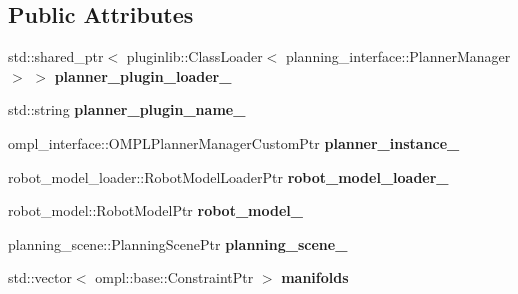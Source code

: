 \subsection*{Public Attributes}
\begin{DoxyCompactItemize}
\item 
\mbox{\label{class_r_n_b_1_1_moveit_compact_1_1_planner_a699273092d7acf03820904b416011a55}} 
std\+::shared\+\_\+ptr$<$ pluginlib\+::\+Class\+Loader$<$ planning\+\_\+interface\+::\+Planner\+Manager $>$ $>$ {\bfseries planner\+\_\+plugin\+\_\+loader\+\_\+}
\item 
\mbox{\label{class_r_n_b_1_1_moveit_compact_1_1_planner_acb371b25a0313b228f51af6cffe53ea5}} 
std\+::string {\bfseries planner\+\_\+plugin\+\_\+name\+\_\+}
\item 
\mbox{\label{class_r_n_b_1_1_moveit_compact_1_1_planner_ace4a50ccd6df165981411e7d7177f477}} 
ompl\+\_\+interface\+::\+O\+M\+P\+L\+Planner\+Manager\+Custom\+Ptr {\bfseries planner\+\_\+instance\+\_\+}
\item 
\mbox{\label{class_r_n_b_1_1_moveit_compact_1_1_planner_a2cd6db06c9c271f5c00d1bfb4768743d}} 
robot\+\_\+model\+\_\+loader\+::\+Robot\+Model\+Loader\+Ptr {\bfseries robot\+\_\+model\+\_\+loader\+\_\+}
\item 
\mbox{\label{class_r_n_b_1_1_moveit_compact_1_1_planner_a4cb1bfd8389d3697aef6371cd5a16028}} 
robot\+\_\+model\+::\+Robot\+Model\+Ptr {\bfseries robot\+\_\+model\+\_\+}
\item 
\mbox{\label{class_r_n_b_1_1_moveit_compact_1_1_planner_aa4eafd49a28d153cafcf17d248016c92}} 
planning\+\_\+scene\+::\+Planning\+Scene\+Ptr {\bfseries planning\+\_\+scene\+\_\+}
\item 
\mbox{\label{class_r_n_b_1_1_moveit_compact_1_1_planner_af298d58a5ff8a485337dfd8e203a1f54}} 
std\+::vector$<$ ompl\+::base\+::\+Constraint\+Ptr $>$ {\bfseries manifolds}
\item 
\mbox{\label{class_r_n_b_1_1_moveit_compact_1_1_planner_a1fa16030261b411fe82e729d8f25a492}} 

\end{DoxyCompactItemize}
